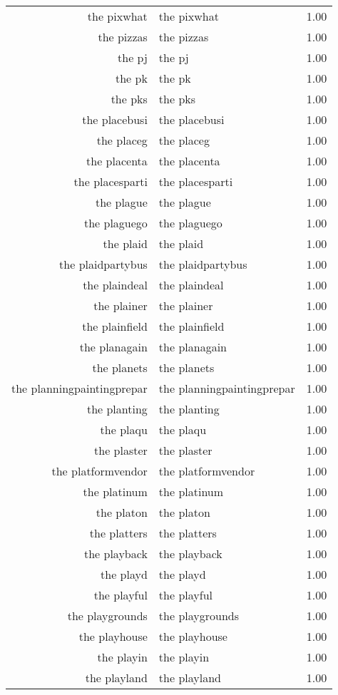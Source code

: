 \begin{table}[ht]
\begin{tabular}{rlr}
  the pixwhat & the pixwhat & 1.00 \\ 
  the pizzas & the pizzas & 1.00 \\ 
  the pj & the pj & 1.00 \\ 
  the pk & the pk & 1.00 \\ 
  the pks & the pks & 1.00 \\ 
  the placebusi & the placebusi & 1.00 \\ 
  the placeg & the placeg & 1.00 \\ 
  the placenta & the placenta & 1.00 \\ 
  the placesparti & the placesparti & 1.00 \\ 
  the plague & the plague & 1.00 \\ 
  the plaguego & the plaguego & 1.00 \\ 
  the plaid & the plaid & 1.00 \\ 
  the plaidpartybus & the plaidpartybus & 1.00 \\ 
  the plaindeal & the plaindeal & 1.00 \\ 
  the plainer & the plainer & 1.00 \\ 
  the plainfield & the plainfield & 1.00 \\ 
  the planagain & the planagain & 1.00 \\ 
  the planets & the planets & 1.00 \\ 
  the planningpaintingprepar & the planningpaintingprepar & 1.00 \\ 
  the planting & the planting & 1.00 \\ 
  the plaqu & the plaqu & 1.00 \\ 
  the plaster & the plaster & 1.00 \\ 
  the platformvendor & the platformvendor & 1.00 \\ 
  the platinum & the platinum & 1.00 \\ 
  the platon & the platon & 1.00 \\ 
  the platters & the platters & 1.00 \\ 
  the playback & the playback & 1.00 \\ 
  the playd & the playd & 1.00 \\ 
  the playful & the playful & 1.00 \\ 
  the playgrounds & the playgrounds & 1.00 \\ 
  the playhouse & the playhouse & 1.00 \\ 
  the playin & the playin & 1.00 \\ 
  the playland & the playland & 1.00 \\ 

\end{tabular}
\end{table}
